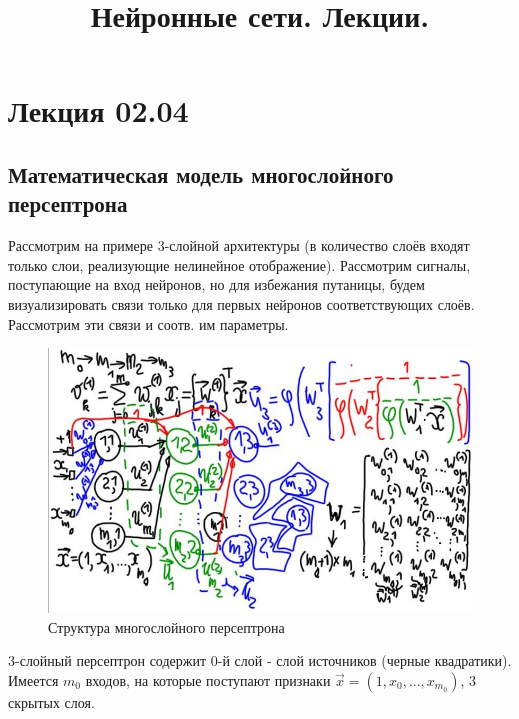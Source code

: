 \documentclass[a4paper]{article}
\numberwithin{equation}{subsection}
\begin{document}
\title{Нейронные сети. Лекции.}

\makeatletter
\begin{center}
    {\fontsize{14pt}{24pt}\selectfont\bfseries\@title\par}
    {\fontsize{14pt}{16pt}\@author\par}
\end{center}
\makeatother

\tableofcontents

\section{Лекция 02.04}

\subsection{Математическая модель многослойного персептрона}

Рассмотрим на примере 3-слойной архитектуры (в количество слоёв входят только 
слои, реализующие нелинейное отображение).
Рассмотрим сигналы, поступающие на вход нейронов, но для избежания 
путаницы, будем визуализировать связи только для первых нейронов соответствующих слоёв.
Рассмотрим эти связи и соотв. им параметры.

\begin{figure}[htbp]
    \centering
    \includegraphics[width=\textwidth]{hyperflat_3_1.jpeg}
    \caption{Структура многослойного персептрона}
    \label{hyperflat_3_1}
\end{figure}

3-слойный персептрон содержит 0-й слой - слой источников (черные квадратики). 
Имеется $m_{0}$ входов, на которые поступают признаки 
$\vec{x} = (1, x_0, ..., x_{m_{0}})$, 3 скрытых слоя.
\end{document}
